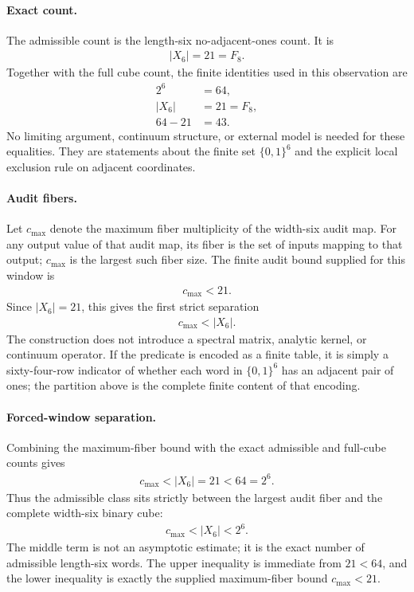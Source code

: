 \paragraph{Exact count.}
The admissible count is the length-six no-adjacent-ones count.  It is
$$
\begin{aligned}
|X_6|=21=F_8 .
\end{aligned}
$$
Together with the full cube count, the finite identities used in this observation are
$$
\begin{aligned}
2^6&=64,\\
|X_6|&=21=F_8,\\
64-21&=43 .
\end{aligned}
$$
No limiting argument, continuum structure, or external model is needed for these equalities.  They are statements about the finite set $\{0,1\}^6$ and the explicit local exclusion rule on adjacent coordinates.

\paragraph{Audit fibers.}
Let $c_{\max}$ denote the maximum fiber multiplicity of the width-six audit map.  For any output value of that audit map, its fiber is the set of inputs mapping to that output; $c_{\max}$ is the largest such fiber size.  The finite audit bound supplied for this window is
$$
\begin{aligned}
c_{\max}<21 .
\end{aligned}
$$
Since $|X_6|=21$, this gives the first strict separation
$$
\begin{aligned}
c_{\max}<|X_6| .
\end{aligned}
$$
The construction does not introduce a spectral matrix, analytic kernel, or continuum operator.  If the predicate is encoded as a finite table, it is simply a sixty-four-row indicator of whether each word in $\{0,1\}^6$ has an adjacent pair of ones; the partition above is the complete finite content of that encoding.

\paragraph{Forced-window separation.}
Combining the maximum-fiber bound with the exact admissible and full-cube counts gives
$$
\begin{aligned}
c_{\max}<|X_6|=21<64=2^6 .
\end{aligned}
$$
Thus the admissible class sits strictly between the largest audit fiber and the complete width-six binary cube:
$$
\begin{aligned}
c_{\max}<|X_6|<2^6 .
\end{aligned}
$$
The middle term is not an asymptotic estimate; it is the exact number of admissible length-six words.  The upper inequality is immediate from $21<64$, and the lower inequality is exactly the supplied maximum-fiber bound $c_{\max}<21$.

